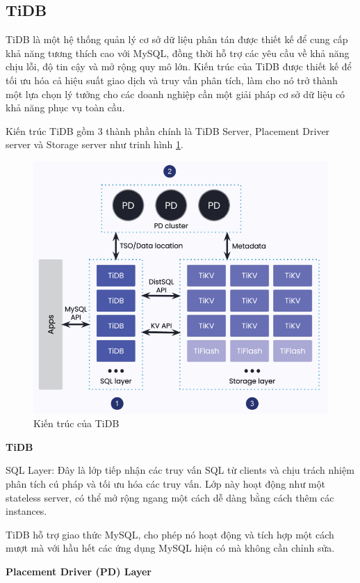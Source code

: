\documentclass{article}[14pt]
\begin{document}
\subsection{TiDB}

TiDB \cite{huang2020tidb} là một hệ thống quản lý cơ sở dữ liệu phân tán được thiết kế để cung cấp khả năng tương thích cao với MySQL, đồng thời hỗ trợ các yêu cầu về khả năng chịu lỗi, độ tin cậy và mở rộng quy mô lớn. Kiến trúc của TiDB được thiết kế để tối ưu hóa cả hiệu suất giao dịch và truy vấn phân tích, làm cho nó trở thành một lựa chọn lý tưởng cho các doanh nghiệp cần một giải pháp cơ sở dữ liệu có khả năng phục vụ toàn cầu.

Kiến trúc TiDB gồm 3 thành phần chính là TiDB Server, Placement Driver server và Storage server như trinh hình \ref{fig:TiDBArchiteture}.


\begin{figure}
    \centering
    \includegraphics[width=0.6\linewidth]{images/TiDBArchiteture.png}
    \caption{Kiến trúc của TiDB\protect\footnotemark}
    \label{fig:TiDBArchiteture}
\end{figure}




\textbf{TiDB}

SQL Layer: Đây là lớp tiếp nhận các truy vấn SQL từ clients và chịu trách nhiệm phân tích cú pháp và tối ưu hóa các truy vấn. Lớp này hoạt động như một stateless server, có thể mở rộng ngang một cách dễ dàng bằng cách thêm các instances.

TiDB hỗ trợ giao thức MySQL, cho phép nó hoạt động và tích hợp một cách mượt mà với hầu hết các ứng dụng MySQL hiện có mà không cần chỉnh sửa.

\textbf{Placement Driver (PD) Layer}
\end{document}
